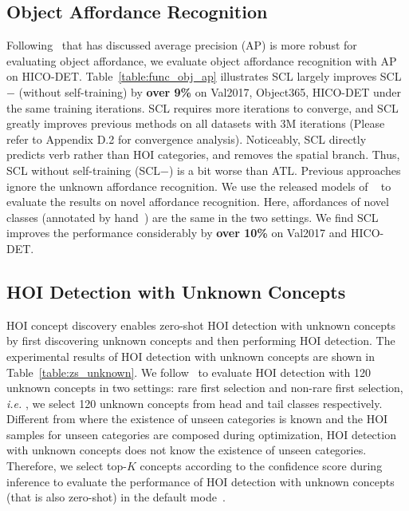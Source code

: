 \documentclass[runningheads]{llncs}
\newcommand{\ie}{\textit{i.e. }}
\begin{document}
\subsection{Object Affordance Recognition}
\label{sec:affordance}

Following~\cite{hou2021atl} that has discussed average precision (AP) is more robust for evaluating object affordance, we evaluate object affordance recognition with AP on HICO-DET. Table~\ref{table:func_obj_ap} illustrates SCL largely improves SCL$-$ (without self-training) by {\bf over 9\%} on Val2017, Object365, HICO-DET under the same training iterations. SCL requires more iterations to converge, and SCL greatly improves previous methods on all datasets with 3M iterations (Please refer to Appendix D.2 for convergence analysis). Noticeably, SCL directly predicts verb rather than HOI categories, and removes the spatial branch. Thus, SCL without self-training (SCL$-$) is a bit worse than ATL. Previous approaches ignore the unknown affordance recognition. We use the released models of ~\cite{hou2021atl} to evaluate the results on novel affordance recognition. Here, affordances of novel classes (annotated by hand~\cite{hou2021atl}) are the same in the two settings. We find SCL improves the performance considerably by {\bf over 10\%} on Val2017 and HICO-DET.




\subsection{HOI Detection with Unknown Concepts}

HOI concept discovery enables zero-shot HOI detection with unknown concepts by first discovering unknown concepts and then performing HOI detection. The experimental results of HOI detection with unknown concepts are shown in Table~\ref{table:zs_unknown}. We follow~\cite{hou2020visual} to evaluate HOI detection with 120 unknown concepts in two settings: rare first selection and non-rare first selection, \ie, we select 120 unknown concepts from head and tail classes respectively. Different from \cite{hou2020visual,hou2021fcl} where the existence of unseen categories is known and the HOI samples for unseen categories are composed during optimization, HOI detection with unknown concepts does not know the existence of unseen categories. Therefore, we select top-$K$ concepts according to the confidence score during inference to evaluate the performance of HOI detection with unknown concepts (that is also zero-shot) in the default mode~\cite{chao2018learning}.
\end{document}
